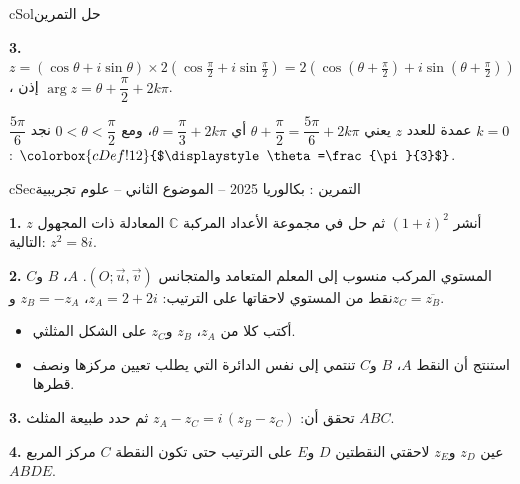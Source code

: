 \documentclass[12pt,a4paper]{article}
\newenvironment{BOX}[2]{\begin{otherlanguage}{english}\begin{arbox}{#1}{#2}}{\end{arbox}\end{otherlanguage}}
\newcounter{exo}
\newenvironment{tamrin}[1]{\stepcounter{exo}\begin{BOX}{cSec}{التمرين \theexo: #1}}{\end{BOX}}
\newenvironment{hal}{\Needspace{12\baselineskip}\begin{otherlanguage}{english}\begin{arbox}[breakable]{cSol}{حل التمرين \theexo}}{\end{arbox}\end{otherlanguage}}
\newcommand{\bx}[1]{\ensuremath{\colorbox{cDef!12}{$\displaystyle #1$}}}
\newenvironment{sq}{\begin{itemize}[leftmargin=2.4em,itemsep=3pt]}{\end{itemize}}
\newcommand{\qa}{\item[(أ)]}\newcommand{\qb}{\item[(ب)]}\newcommand{\qc}{\item[(جـ)]}\newcommand{\qd}{\item[(د)]}\newcommand{\qe}{\item[(هـ)]}
\newcommand{\QQ}[1]{\par\smallskip\textbf{#1.} }
\begin{document}
\begin{hal}
\QQ{3} $z=(\cos\theta+i\sin\theta)\times2\left(\cos\tfrac{\pi}{2}+i\sin\tfrac{\pi}{2}\right)=2\left(\cos\left(\theta+\tfrac{\pi}{2}\right)+i\sin\left(\theta+\tfrac{\pi}{2}\right)\right)$،
إذن $\arg z=\theta+\dfrac{\pi}{2}+2k\pi$.

$\dfrac{5\pi}{6}$ عمدة للعدد $z$ يعني $\theta+\dfrac{\pi}{2}=\dfrac{5\pi}{6}+2k\pi$ أي $\theta=\dfrac{\pi}{3}+2k\pi$، ومع $0<\theta<\dfrac{\pi}{2}$ نجد $k=0$:
\bx{\theta=\frac{\pi}{3}}.
\end{hal}

\begin{tamrin}{بكالوريا 2025 -- الموضوع الثاني -- علوم تجريبية}
\QQ{1} أنشر $(1+i)^2$ ثم حل في مجموعة الأعداد المركبة $\mathbb{C}$ المعادلة ذات المجهول $z$ التالية: $z^2=8i$.
\QQ{2} المستوي المركب منسوب إلى المعلم المتعامد والمتجانس $(O;\vec u,\vec v)$. $A$، $B$ و$C$ نقط من المستوي لاحقاتها على الترتيب: $z_A=2+2i$، $z_B=-z_A$ و$z_C=\overline{z_B}$.
\begin{sq}
\qa أكتب كلا من $z_A$، $z_B$ و$z_C$ على الشكل المثلثي.
\qb استنتج أن النقط $A$، $B$ و$C$ تنتمي إلى نفس الدائرة التي يطلب تعيين مركزها ونصف قطرها.
\end{sq}
\QQ{3} تحقق أن: $z_A-z_C=i\,(z_B-z_C)$ ثم حدد طبيعة المثلث $ABC$.
\QQ{4} عين $z_D$ و$z_E$ لاحقتي النقطتين $D$ و$E$ على الترتيب حتى تكون النقطة $C$ مركز المربع $ABDE$.
\end{tamrin}
\end{document}
